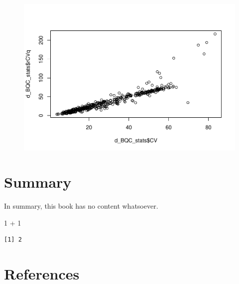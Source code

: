 \documentclass[
  letterpaper,
  DIV=11,
  numbers=noendperiod]{scrreprt}
\newenvironment{Shaded}{\begin{snugshade}}{\end{snugshade}}
\newcommand{\DecValTok}[1]{\textcolor[rgb]{0.68,0.00,0.00}{#1}}
\newcommand{\FunctionTok}[1]{\textcolor[rgb]{0.28,0.35,0.67}{#1}}
\newcommand{\NormalTok}[1]{\textcolor[rgb]{0.00,0.23,0.31}{#1}}
\newcommand{\SpecialCharTok}[1]{\textcolor[rgb]{0.37,0.37,0.37}{#1}}
\newlength{\cslhangindent}
\newlength{\cslentryspacingunit} %
\newenvironment{CSLReferences}[2] %
 {%
  \setlength{\parindent}{0pt}
  \ifodd #1
  \let\oldpar\par
  \def\par{\hangindent=\cslhangindent\oldpar}
  \fi
  \setlength{\parskip}{#2\cslentryspacingunit}
 }%
 {}
\begin{document}
\begin{Shaded}
\end{Shaded}

\begin{figure}[H]

{\centering \includegraphics{./datawrangling_files/figure-pdf/calulcate-column-stats-9.pdf}

}

\end{figure}

\hypertarget{summary}{%
\chapter{Summary}\label{summary}}

In summary, this book has no content whatsoever.

\begin{Shaded}
\begin{Highlighting}[]
\DecValTok{1} \SpecialCharTok{+} \DecValTok{1}
\end{Highlighting}
\end{Shaded}

\begin{verbatim}
[1] 2
\end{verbatim}

\hypertarget{references}{%
\chapter*{References}\label{references}}

\hypertarget{refs}{}
\begin{CSLReferences}{0}{0}
\end{CSLReferences}
\end{document}
